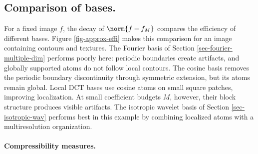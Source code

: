 



\subsection{Comparison of bases.}

For a fixed image $f$, the decay of $\norm{f-f_M}$ compares the efficiency of different bases. Figure \ref{fig-approx-effi} makes this comparison for an image containing contours and textures. The Fourier basis of Section \ref{sec-fourier-multiple-dim} performs poorly here: periodic boundaries create artifacts, and globally supported atoms do not follow local contours. The cosine basis removes the periodic boundary discontinuity through symmetric extension, but its atoms remain global. Local DCT bases use cosine atoms on small square patches, improving localization. At small coefficient budgets $M$, however, their block structure produces visible artifacts. The isotropic wavelet basis of Section \ref{sec-isotropic-wav} performs best in this example by combining localized atoms with a multiresolution organization.





\paragraph{Compressibility measures.}

